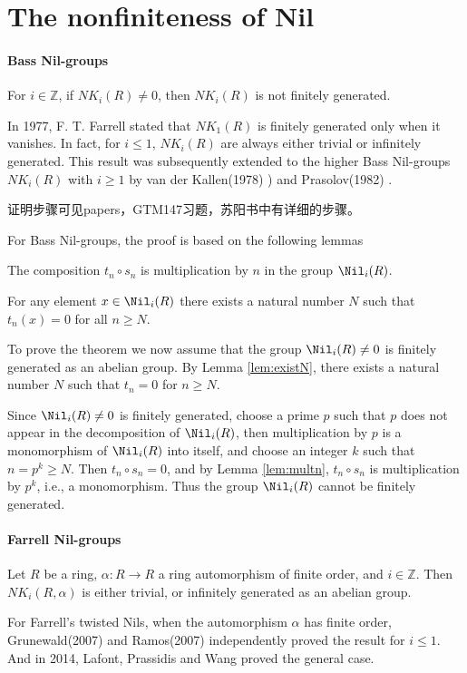 \section{The nonfiniteness of Nil} %
\label{sec:the_nonfiniteness_of_nil}
\paragraph{Bass Nil-groups}
	\begin{theorem}
		For $i\in \mathbb{Z}$, if $NK_i(R)\neq 0$, then $NK_i(R)$ is not finitely generated.
	\end{theorem}
	In 1977, F. T. Farrell\cite{MR56:8624} stated that $NK_1(R)$ is finitely generated only when it vanishes. In fact, for $i\leq 1$, $NK_i(R)$ are always either trivial or infinitely generated.
	This result was subsequently extended to the higher Bass Nil-groups $NK_i(R)$ with $i\geq 1$
	by  van der Kallen(1978) \cite{MR81g:18017}) and Prasolov(1982) \cite{Prasolov1982} . 

	证明步骤可见papers，GTM147习题，苏阳书中有详细的步骤。

	For Bass Nil-groups, the proof is based on the following lemmas
\begin{lemma}
\label{lem:multn}
	The composition $t_n\circ s_n$  is multiplication by $n$ in the group  $\Nil_i(R)$.
\end{lemma}
\begin{lemma}
\label{lem:existN}
	For any element  $x\in \Nil_i(R)$  there exists a natural number $N$ such that $t_n(x) = 0$ for all  $n\geq N$.
\end{lemma}
To prove the theorem we now assume that the group  $\Nil_i(R)\neq 0$ is finitely generated as an abelian group.  By Lemma \ref{lem:existN}, there exists a natural number $N$ such that $t_n = 0$ for  $n\geq N$.  

Since $\Nil_i(R)\neq 0$ is finitely generated, choose a prime $p$ such that $p$ does not appear in the decomposition of $\Nil_i(R)$, then multiplication by $p$ is a monomorphism of  $\Nil_i(R)$ into itself, and choose an integer $k$ such that $n = p^k\geq N$.  Then $t_n\circ s_n=0$, and by Lemma \ref{lem:multn}, $t_n\circ s_n$ is multiplication by $p^k$, i.e., a monomorphism.  Thus the group  $\Nil_i(R)$  cannot be finitely generated.

\paragraph{Farrell Nil-groups}
	\begin{theorem}
		Let $R$ be a ring, $\alpha \colon R \longrightarrow R$ a ring automorphism of finite order, and $i \in \mathbb{Z}$. Then $NK_i(R,\alpha)$ is either trivial, or infinitely generated as an abelian group.
	\end{theorem}
	For Farrell's twisted Nils, when the automorphism $\alpha$ has finite order, Grunewald(2007)\cite{Grunewald2007Non} and Ramos(2007)\cite{Ramos2007Non} independently proved the result for $i \leq 1$. And in 2014, Lafont, Prassidis and Wang\cite{Lafont2014Revisiting} proved the general case.
	
